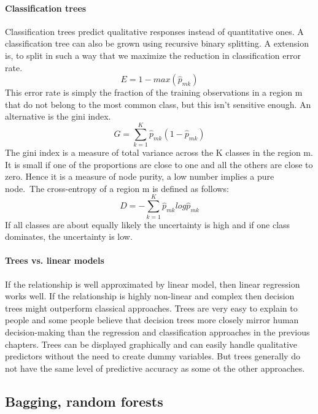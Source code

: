 \documentclass[../document.tex]{subfiles}
\begin{document}
	\paragraph{Classification trees}
	Classification trees predict qualitative responses instead of quantitative ones. A classification tree can also be grown using recursive binary splitting. A extension is, to split in such a way that we maximize the reduction in classification error rate.
	\begin{equation}
		E = 1-max(\hat{p}_{mk})
	\end{equation}
	This error rate is simply the fraction of the training observations in a region m that do not belong to the most common class, but this isn't sensitive enough. An alternative is the gini index.
	\begin{equation}
		G = \sum_{k=1}^{K}\hat{p}_{mk}(1-\hat{p}_{mk})
	\end{equation}
	The gini index is a measure of total variance across the K classes in the region m. It is small if one of the proportions are close to one and all the others are close to zero. Hence it is a measure of node purity, a low number implies a pure node.\
	The cross-entropy of a region m is defined as follows:
	\begin{equation}
		D = -\sum_{k=1}^{K}\hat{p}_{mk}log\hat{p}_{mk}
	\end{equation}
	If all classes are about equally likely the uncertainty is high and if one class dominates, the uncertainty is low.

	\paragraph{Trees vs. linear models}
	If the relationship is well approximated by linear model, then linear regression works well. If the relationship is highly non-linear and complex then decision trees might outperform classical approaches. Trees are very easy to explain to people and some people believe that decision trees more closely mirror human decision-making than the regression and classification approaches in the previous chapters. Trees can be displayed graphically and can easily handle qualitative predictors without the need to create dummy variables. But trees generally do not have the same level of predictive accuracy as some ot the other approaches.

	\subsection{Bagging, random forests}
\end{document}
